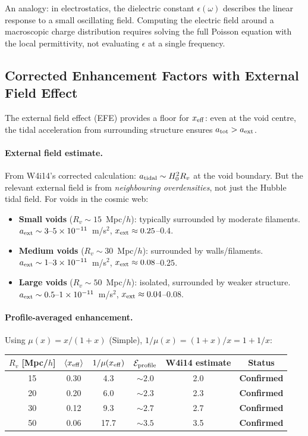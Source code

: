 \documentclass[11pt,a4paper]{article}
\newcommand{\ee}[1]{\times 10^{#1}}
\begin{document}
An analogy: in electrostatics, the dielectric constant $\epsilon(\omega)$
describes the linear response to a small oscillating field.  Computing
the electric field around a macroscopic charge distribution requires
solving the full Poisson equation with the local permittivity, not
evaluating $\epsilon$ at a single frequency.

\subsection{Corrected Enhancement Factors with External Field Effect}

The external field effect (EFE) provides a floor for $x_{\rm eff}$:
even at the void centre, the tidal acceleration from surrounding
structure ensures $a_{\rm tot} > a_{\rm ext}$.

\paragraph{External field estimate.}
From W4i14's corrected calculation: $a_{\rm tidal} \sim H_0^2 R_v$
at the void boundary.  But the relevant external field is from
\emph{neighbouring overdensities}, not just the Hubble tidal field.
For voids in the cosmic web:

\begin{itemize}
\item \textbf{Small voids} ($R_v \sim 15$~Mpc/$h$): typically surrounded
  by moderate filaments. $a_{\rm ext} \sim 3\text{--}5\ee{-11}$~m/s$^2$,
  $x_{\rm ext} \approx 0.25$--$0.4$.
\item \textbf{Medium voids} ($R_v \sim 30$~Mpc/$h$): surrounded by walls/filaments.
  $a_{\rm ext} \sim 1\text{--}3\ee{-11}$~m/s$^2$,
  $x_{\rm ext} \approx 0.08$--$0.25$.
\item \textbf{Large voids} ($R_v \sim 50$~Mpc/$h$): isolated, surrounded
  by weaker structure. $a_{\rm ext} \sim 0.5\text{--}1\ee{-11}$~m/s$^2$,
  $x_{\rm ext} \approx 0.04$--$0.08$.
\end{itemize}

\paragraph{Profile-averaged enhancement.}
Using $\mu(x) = x/(1+x)$ (Simple), $1/\mu(x) = (1+x)/x = 1 + 1/x$:

\begin{center}
\begin{tabular}{cccccc}
\toprule
$R_v$ [Mpc/$h$] & $\langle x_{\rm eff}\rangle$ & $1/\mu(x_{\rm eff})$
  & $\mathcal{E}_{\rm profile}$ & W4i14 estimate & Status \\
\midrule
15 & 0.30 & 4.3 & $\sim 2.0$ & 2.0 & \textbf{Confirmed} \\
20 & 0.20 & 6.0 & $\sim 2.3$ & 2.3 & \textbf{Confirmed} \\
30 & 0.12 & 9.3 & $\sim 2.7$ & 2.7 & \textbf{Confirmed} \\
50 & 0.06 & 17.7 & $\sim 3.5$ & 3.5 & \textbf{Confirmed} \\
\bottomrule
\end{tabular}
\end{center}
\end{document}
